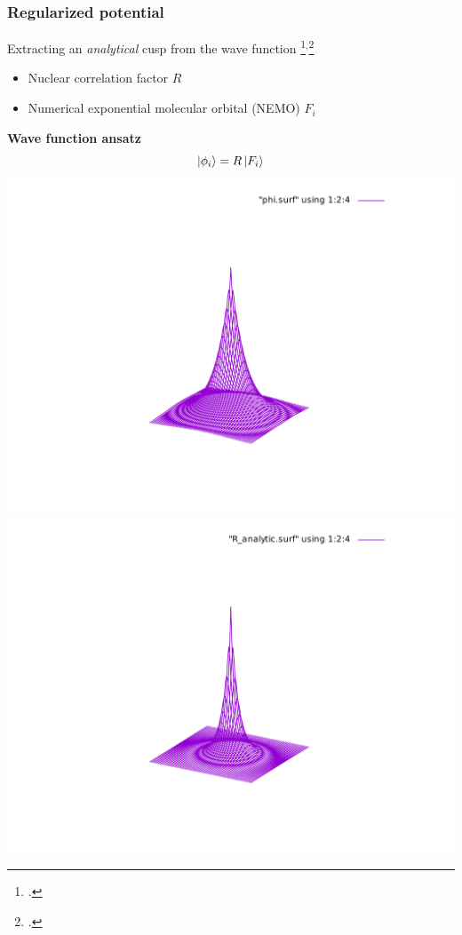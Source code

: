 \begin{frame}
\frametitle{Regularized potential}
\scriptsize

Extracting an \emph{analytical} cusp from the wave function
\footcite{Seelig_1966}$^,$\footcite{Bischoff_2014a}
\begin{itemize}
    \item Nuclear correlation factor $R$
    \item Numerical exponential molecular orbital (NEMO) $F_i$
\end{itemize}

\vspace{5mm}

\centering
\textbf{Wave function ansatz}
\begin{equation}
    \nonumber
    \ket{\phi_i} = R\ket{F_i}
\end{equation}
\includegraphics[scale=0.35, viewport = 175 90 430 400, clip]{figures/phi.pdf}
\includegraphics[scale=0.35, viewport = 175 90 430 400, clip]{figures/R.pdf}

\end{frame}
